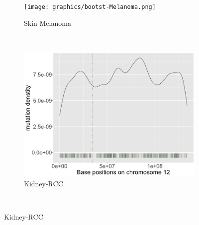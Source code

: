 \begin{figure}[ht!]
    \begin{subfigure}{.5\textwidth}
    \texttt{[image: graphics/bootst-Melanoma.png]}
    \caption{Skin-Melanoma}
    \label{fig:density_skin}
    \end{subfigure}
    ~
    \begin{subfigure}{.5\textwidth}
    
    \includegraphics[width=\linewidth,height=0.7\textwidth]{graphics/mutdistribution_Kidney-RCC.png}
    \caption{Kidney-RCC}
    \label{fig:density_kidney}
    \end{subfigure} \\
    \vspace{0.5cm}
    

\end{figure}
